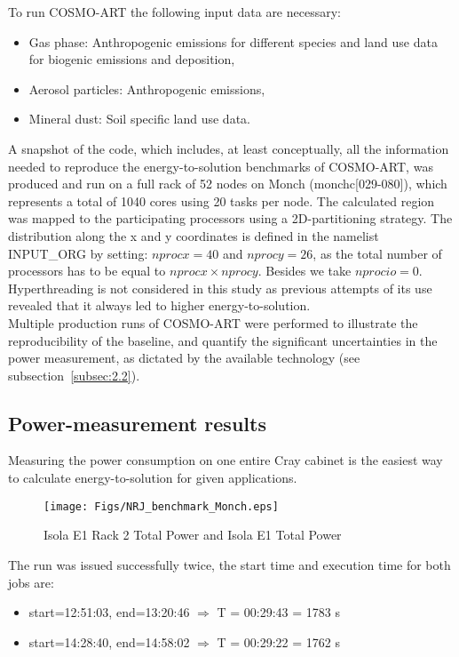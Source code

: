 \noindent
To run COSMO-ART the following input data are necessary:
\begin{itemize}
\item  Gas phase:  Anthropogenic emissions  for different  species and
  land use data for biogenic emissions and deposition,
\item Aerosol particles: Anthropogenic emissions,
\item Mineral dust: Soil specific land use data.
\end{itemize}

A snapshot of the code, which includes, at least conceptually, all the
information needed  to reproduce the  energy-to-solution benchmarks of
COSMO-ART, was  produced and run on a  full rack of 52  nodes on Monch
(monchc[029-080]),  which represents a  total of  1040 cores  using 20
tasks per node.  The calculated region was mapped to the participating
processors  using a 2D-partitioning  strategy. The  distribution along
the  x and  y coordinates  is defined  in the  namelist  INPUT\_ORG by
setting:  $nprocx=40$   and  $nprocy=26$,  as  the   total  number  of
processors has to be equal to $nprocx \times nprocy$.  Besides we take
$nprocio=0$.   Hyperthreading  is  not  considered in  this  study  as
previous attempts  of its  use revealed that  it always led  to higher
energy-to-solution.\\

Multiple production runs of COSMO-ART were performed to illustrate the
reproducibility  of   the  baseline,  and   quantify  the  significant
uncertainties in  the power measurement, as dictated  by the available
technology (see subsection~\ref{subsec:2.2}).

\subsection{Power-measurement results}
\label{subsec:3.3}
Measuring  the power  consumption on  one entire  Cray cabinet  is the
easiest way to calculate energy-to-solution for given applications.

\begin{figure*}
  \texttt{[image: Figs/NRJ\_benchmark\_Monch.eps]}
  \caption{Isola E1 Rack 2 Total Power and Isola E1 Total Power}
  \label{fig:1}
\end{figure*}

The run  was issued successfully  twice, the start time  and execution
time for both jobs are:
\begin{itemize}
\item start=12:51:03, end=13:20:46 $\Rightarrow$ T = 00:29:43 = 1783 s
\item start=14:28:40, end=14:58:02 $\Rightarrow$ T = 00:29:22 = 1762 s
\end{itemize}

